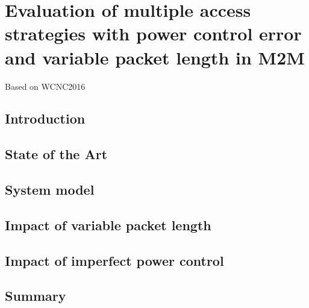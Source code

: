 \chapter{Evaluation of multiple access strategies with power control error 
and variable packet length in M2M}

\ifpdf
    \graphicspath{{Chapter3/Figs/Raster/}{Chapter3/Figs/PDF/}{Chapter3/Figs/}}
\else
    \graphicspath{{Chapter3/Figs/Vector/}{Chapter3/Figs/}}
\fi

Based on WCNC2016
\section{Introduction}


\section{State of the Art}

\section{System model}


\section{Impact of variable packet length}


\section{Impact of imperfect power control}


\section{Summary}




